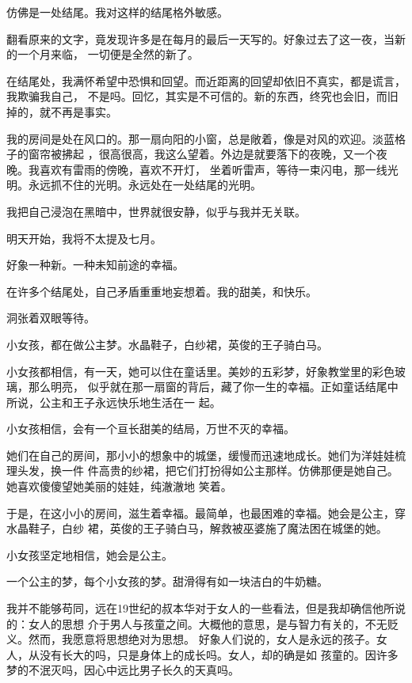 \documentclass[12pt,a4paper]{article}
\begin{document}
		仿佛是一处结尾。我对这样的结尾格外敏感。

		翻看原来的文字，竟发现许多是在每月的最后一天写的。好象过去了这一夜，当新的一个月来临，
	一切便是全然的新了。

		在结尾处，我满怀希望中恐惧和回望。而近距离的回望却依旧不真实，都是谎言，我欺骗我自己，
	不是吗。回忆，其实是不可信的。新的东西，终究也会旧，而旧掉的，就不再是事实。

		我的房间是处在风口的。那一扇向阳的小窗，总是敞着，像是对风的欢迎。淡蓝格子的窗帘被拂起
	，很高很高，我这么望着。外边是就要落下的夜晚，又一个夜晚。我喜欢有雷雨的傍晚，喜欢不开灯，
	坐着听雷声，等待一束闪电，那一线光明。永远抓不住的光明。永远处在一处结尾的光明。

		我把自己浸泡在黑暗中，世界就很安静，似乎与我并无关联。\par
		明天开始，我将不太提及七月。\par
		好象一种新。一种未知前途的幸福。\par
		在许多个结尾处，自己矛盾重重地妄想着。我的甜美，和快乐。\par
		洞张着双眼等待。

	\endwriting



		小女孩，都在做公主梦。水晶鞋子，白纱裙，英俊的王子骑白马。

		小女孩都相信，有一天，她可以住在童话里。美妙的五彩梦，好象教堂里的彩色玻璃，那么明亮，
	似乎就在那一扇窗的背后，藏了你一生的幸福。正如童话结尾中所说，公主和王子永远快乐地生活在一
	起。

		小女孩相信，会有一个亘长甜美的结局，万世不灭的幸福。

		她们在自己的房间，那小小的想象中的城堡，缓慢而迅速地成长。她们为洋娃娃梳理头发，换一件
	件高贵的纱裙，把它们打扮得如公主那样。仿佛那便是她自己。她喜欢傻傻望她美丽的娃娃，纯澈澈地
	笑着。

		于是，在这小小的房间，滋生着幸福。最简单，也最困难的幸福。她会是公主，穿水晶鞋子，白纱
	裙，英俊的王子骑白马，解救被巫婆施了魔法困在城堡的她。

		小女孩坚定地相信，她会是公主。

		一个公主的梦，每个小女孩的梦。甜滑得有如一块洁白的牛奶糖。

		我并不能够苟同，远在19世纪的叔本华对于女人的一些看法，但是我却确信他所说的：女人的思想
	介于男人与孩童之间。大概他的意思，是与智力有关的，不无贬义。然而，我愿意将思想绝对为思想。
	好象人们说的，女人是永远的孩子。女人，从没有长大的吗，只是身体上的成长吗。女人，却的确是如
	孩童的。因许多梦的不泯灭吗，因心中远比男子长久的天真吗。
\end{document}
